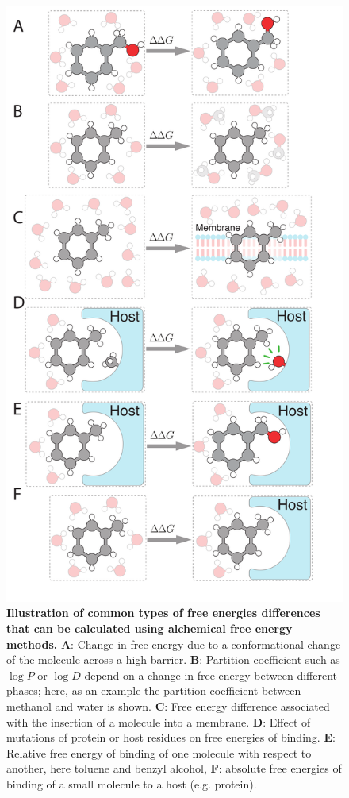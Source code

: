 \documentclass[9pt,bestpractices]{livecoms}
\begin{document}
\begin{figure}
    \includegraphics[width=0.95\linewidth]{figures/fig1_what_is_alchemy/Figure.pdf}   
    \caption{\textbf{Illustration of common types of free energies differences that can be calculated using alchemical free energy methods.} \textbf{A}: Change in free energy due to a conformational change of the molecule across a high barrier. \textbf{B}: Partition coefficient such as $\log P$ or $\log D$ depend on a change in free energy between different phases; here, as an example the partition coefficient between methanol and water is shown. \textbf{C}: Free energy difference associated with the insertion of a molecule into a membrane. \textbf{D}: Effect of mutations of protein or host residues on free energies of binding. \textbf{E}: Relative free energy of binding of one molecule with respect to another, here toluene and benzyl alcohol, \textbf{F}: absolute free energies of binding of a small molecule to a host (e.g. protein).
    \label{fig:fig_what_is_alchemy}
    }
\end{figure}
\end{document}
